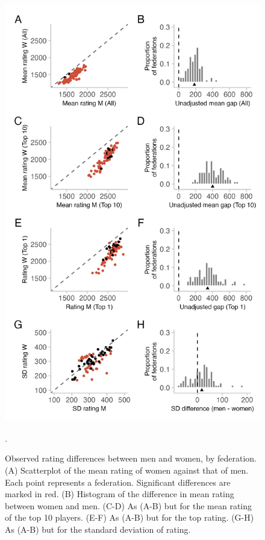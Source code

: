 \documentclass[9pt,twocolumn,twoside,lineno]{pnas-new}
\begin{document}
  \begin{figure}[!ht]
     \centering
     \includegraphics[width = \linewidth]{fig_2_w_jun_no_ina.png}
     \caption{Observed rating differences between men and women,  by federation. (A) Scatterplot of the mean rating of women against that of men. Each point represents a federation. Significant differences are marked in red. (B) Histogram of the difference in mean rating between women and men. (C-D) As (A-B) but for the mean rating of the top 10 players. (E-F) As (A-B) but for the top rating. (G-H) As (A-B) but for the standard deviation of rating.}.
     \label{fig:federation-differences}
 \end{figure}
\end{document}
